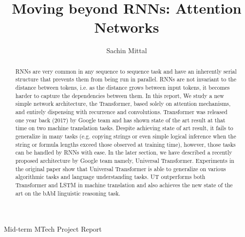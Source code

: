 \documentclass{article}
\title{\large \bf Moving beyond RNNs: Attention Networks }
\author{Sachin Mittal}
\date{}
\begin{document}
	\maketitle
    \begin{center}
        Mid-term MTech Project Report
    \end{center}
        \vskip 12pt
	\thispagestyle{empty}
	
	
		\begin{abstract}
		RNNs are very common in any sequence to sequence task and have an inherently serial structure that prevents them from being run in parallel. RNNs are not invariant to the distance between tokens, i.e. as the distance grows between input tokens, it becomes harder to capture the dependencies between them. In this report, We study a new simple network architecture, the Transformer, based solely on attention mechanisms, and entirely dispensing with recurrence and convolutions. Transformer \cite{DBLP:journals/corr/VaswaniSPUJGKP17} was released one year back (2017) by Google team and has shown state of the art result at that time on two machine translation tasks. Despite achieving state of art result, it fails to generalize in many tasks (e.g. copying strings or even simple logical inference when the string or formula lengths exceed those observed at training time), however, those tasks can be handled by RNNs with ease. 
         In the later section, we have described a recently proposed architecture by Google team namely, Universal Transformer\cite{dehghani2018universal}. Experiments in the original paper show that  Universal Transformer is able to generalize on various algorithmic tasks and language understanding tasks. UT outperforms both Transformer and LSTM in machine translation and also achieves the new state of the art on the bAbI linguistic reasoning task\cite{weston2015aicomplete}.
	\end{abstract}	
	
	\hfill \\
	
\end{document}
